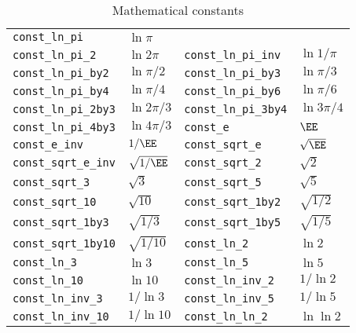 \begin{table}
\begin{tabularx}{\textwidth}{p{1.25in}Lp{1.25in}L}
    \texttt{const\_ln\_pi}         & $\ln{\pi}$      \\
    \texttt{const\_ln\_pi\_2}      & $\ln{2\pi}$     &
    \texttt{const\_ln\_pi\_inv}    & $\ln{1/\pi}$    \\
    \texttt{const\_ln\_pi\_by2}    & $\ln{\pi/2}$    &
    \texttt{const\_ln\_pi\_by3}    & $\ln{\pi/3}$    \\
    \texttt{const\_ln\_pi\_by4}    & $\ln{\pi/4}$    &
    \texttt{const\_ln\_pi\_by6}    & $\ln{\pi/6}$    \\
    \texttt{const\_ln\_pi\_2by3}   & $\ln{2\pi/3}$   &
    \texttt{const\_ln\_pi\_3by4}   & $\ln{3\pi/4}$   \\
    \texttt{const\_ln\_pi\_4by3}   & $\ln{4\pi/3}$   &
    \texttt{const\_e}              & $\EE$           \\
    \texttt{const\_e\_inv}         & $1/\EE$         &
    \texttt{const\_sqrt\_e}        & $\sqrt{\EE}$    \\
    \texttt{const\_sqrt\_e\_inv}   & $\sqrt{1/\EE}$  &
    \texttt{const\_sqrt\_2}        & $\sqrt{2}$      \\
    \texttt{const\_sqrt\_3}        & $\sqrt{3}$      &
    \texttt{const\_sqrt\_5}        & $\sqrt{5}$      \\
    \texttt{const\_sqrt\_10}       & $\sqrt{10}$     &
    \texttt{const\_sqrt\_1by2}     & $\sqrt{1/2}$    \\
    \texttt{const\_sqrt\_1by3}     & $\sqrt{1/3}$    &
    \texttt{const\_sqrt\_1by5}     & $\sqrt{1/5}$    \\
    \texttt{const\_sqrt\_1by10}    & $\sqrt{1/10}$   &
    \texttt{const\_ln\_2}          & $\ln{2}$        \\
    \texttt{const\_ln\_3}          & $\ln{3}$        &
    \texttt{const\_ln\_5}          & $\ln{5}$        \\
    \texttt{const\_ln\_10}         & $\ln{10}$       &
    \texttt{const\_ln\_inv\_2}     & $1/\ln{2}$      \\
    \texttt{const\_ln\_inv\_3}     & $1/\ln{3}$      &
    \texttt{const\_ln\_inv\_5}     & $1/\ln{5}$      \\
    \texttt{const\_ln\_inv\_10}    & $1/\ln{10}$     &
    \texttt{const\_ln\_ln\_2}      & $\ln\ln{2}$     \\
    \bottomrule
  \end{tabularx}
  \caption{Mathematical constants}
  \label{tab:Mathematical constants}
\end{table}

